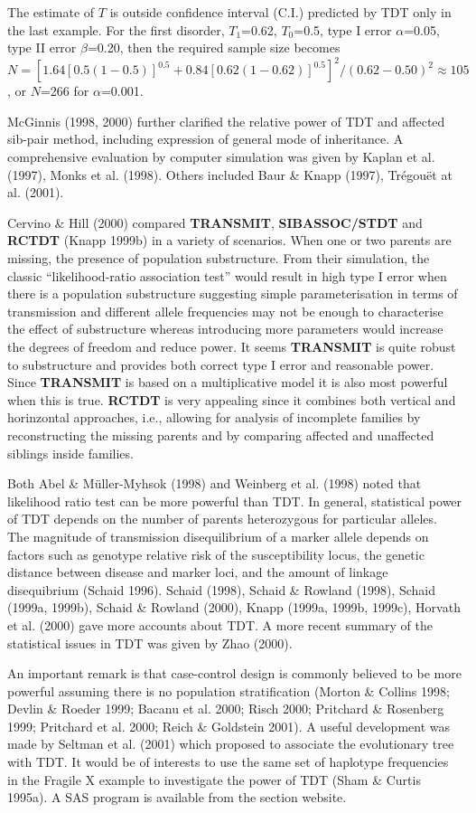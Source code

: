 The estimate of $T$ is outside confidence interval (C.I.) predicted by TDT only
in the last example.  For the first disorder, $T_1$=0.62, $T_0$=0.5, type I
error $\alpha$=0.05, type II error $\beta$=0.20, then the required sample size
becomes
$N=[1.64[0.5(1-0.5)]^{0.5}+0.84[0.62(1-0.62)]^{0.5}]^2/(0.62-0.50)^2\approx
105$, or $N$=266 for $\alpha$=0.001.

McGinnis (1998, 2000) further clarified the relative power of TDT and affected
sib-pair method, including expression of general mode of inheritance.  A
comprehensive evaluation by computer simulation was given by Kaplan et al.
(1997), Monks et al.  (1998).  Others included Baur \& Knapp (1997),
Tr\'{e}gou\"{e}t at al.  (2001).

Cervino \& Hill (2000) compared {\bf TRANSMIT}, {\bf SIBASSOC/STDT} and {\bf
RCTDT} (Knapp 1999b) in a variety of scenarios.  When one or two parents are
missing, the presence of population substructure.  From their simulation, the
classic ``likelihood-ratio association test'' would result in high type I error
when there is a population substructure suggesting simple parameterisation in
terms of transmission and different allele frequencies may not be enough to
characterise the effect of substructure whereas introducing more parameters
would increase the degrees of freedom and reduce power.  It seems {\bf
TRANSMIT} is quite robust to substructure and provides both correct type I
error and reasonable power.  Since {\bf TRANSMIT} is based on a multiplicative
model it is also most powerful when this is true.  {\bf RCTDT} is very
appealing since it combines both vertical and horinzontal approaches, i.e.,
allowing for analysis of incomplete families by reconstructing the missing
parents and by comparing affected and unaffected siblings inside families.

Both Abel \& M\"{u}ller-Myhsok (1998) and Weinberg et al.  (1998) noted that
likelihood ratio test can be more powerful than TDT.  In general, statistical
power of TDT depends on the number of parents heterozygous for particular
alleles.  The magnitude of transmission disequilibrium of a marker allele
depends on factors such as genotype relative risk of the susceptibility locus,
the genetic distance between disease and marker loci, and the amount of linkage
disequibrium (Schaid 1996).  Schaid (1998), Schaid \& Rowland (1998), Schaid
(1999a, 1999b), Schaid \& Rowland (2000), Knapp (1999a, 1999b, 1999c), Horvath
et al.  (2000) gave more accounts about TDT.  A more recent summary of the
statistical issues in TDT was given by Zhao (2000).

An important remark is that case-control design is commonly believed to be more
powerful assuming there is no population stratification (Morton \& Collins
1998; Devlin \& Roeder 1999; Bacanu et al.  2000; Risch 2000; Pritchard \&
Rosenberg 1999; Pritchard et al.  2000; Reich \& Goldstein 2001).  A useful
development was made by Seltman et al.  (2001) which proposed to associate the
evolutionary tree with TDT.  It would be of interests to use the same set of
haplotype frequencies in the Fragile X example to investigate the power of TDT
(Sham \& Curtis 1995a).  A SAS program is available from the section website.
